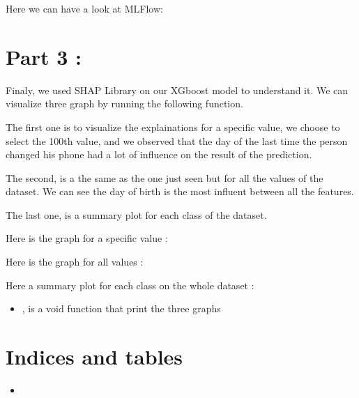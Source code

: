 \documentclass[letterpaper,10pt,english]{sphinxmanual}
\begin{document}
Here we can have a look at MLFlow:

\begin{figure}[htbp]
\centering

\noindent{}
\end{figure}


\chapter{Part 3 :}
\label{\detokenize{index:part-3}}
Finaly, we used SHAP Library on our XGboost model to understand it.
We can visualize three graph by running the following function.

The first one is to visualize the explainations for a specific value,
we choose to select the 100th value, and we observed that the day of the last time the person changed his phone had a lot of influence on the
result of the prediction.

The second, is a the same as the one just seen but for all the values of the dataset. We can see the day of birth is the most influent between all the features.

The last one, is a summary plot for each class of the dataset.

Here is the graph for a specific value :

\begin{figure}[htbp]
\centering

\noindent{}
\end{figure}

Here is the graph for all values :

\begin{figure}[htbp]
\centering

\noindent{}
\end{figure}

Here a summary plot for each class on the whole dataset :

\begin{figure}[htbp]
\centering

\noindent{}
\end{figure}
\begin{itemize}
\item {} 
, is a void function that print the three graphs

\end{itemize}


\chapter{Indices and tables}
\label{\detokenize{index:indices-and-tables}}\begin{itemize}
\item {} 

\end{itemize}



\renewcommand{\indexname}{Index}
\printindex
\end{document}
